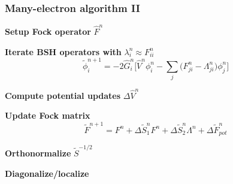 \begin{frame}
    \frametitle{Many-electron algorithm II}
    \centering
    \textbf{Setup Fock operator} $\hat{F}^n$

    \vspace{8mm}

    \textbf{Iterate BSH operators with} $\lambda_i^n \approx F_{ii}^n$
    \begin{equation}
	\nonumber
        \tilde{\phi}_i^{n+1} = -2\hat{G}_i^n \bigg[\hat{V}^n\phi_i^n -
        \sum_j\big(F_{ji}^n - \Lambda_{ji}^n\big)\phi_j^n\bigg]
    \end{equation}

    \vspace{2mm}

    \textbf{Compute potential updates} $\Delta\hat{V}^n$

    \vspace{8mm}

    \textbf{Update Fock matrix}
    \begin{equation}
        \nonumber
        \tilde{F}^{n+1} = F^{n} + 
        \Delta \tilde{S}_1^n F^n +
        \Delta \tilde{S}_2^n \Lambda^n +
        \Delta \tilde{F}_{pot}^n
    \end{equation}

    \vspace{5mm}

    \textbf{Orthonormalize} $\tilde{S}^{-1/2}$

    \vspace{5mm}

    \textbf{Diagonalize/localize}

\end{frame}

